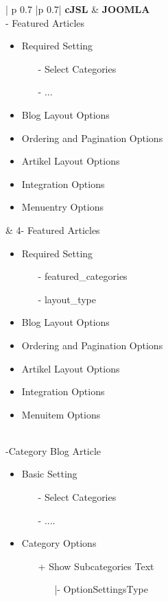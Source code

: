 \begin{minipage}{0.8\textwidth}
\begin{longtable}{| p {0.7\textwidth} |p {0.7\textwidth}|}
\hline
\textbf{cJSL} 
&  
\textbf{JOOMLA} \\ - Featured Articles
\begin{itemize}
	\item Required  Setting 
  		\begin{enumerate}
  		\item[-] Select Categories
  		\item[-] ...
		\end{enumerate}
	\item Blog Layout Options
   	\item Ordering and Pagination Options
   	\item Artikel Layout Options
   	\item Integration Options
   	\item Menuentry Options  
\end{itemize}
&
4- Featured Articles
\begin{itemize}
	\item Required  Setting 
  		\begin{enumerate}
  		\item[-] featured\_categories
  		\item[-] layout\_type
		\end{enumerate}
	\item Blog Layout Options
   	\item Ordering and Pagination Options
   	\item Artikel Layout Options
   	\item Integration Options
   	\item Menuitem Options  
\end{itemize}
\\ -Category Blog Article
\begin{itemize}
\item Basic Setting
	\begin{enumerate}
		\item[-] Select Categories
		\item[-] .... 
	 \end{enumerate}
\item Category Options
	\begin{enumerate}
		\item[+] Show Subcategories Text
			\begin{enumerate}
			\item[|-] OptionSettingsType

\end{enumerate}
\end{enumerate}
\end{itemize}
\end{longtable}
\end{minipage}
